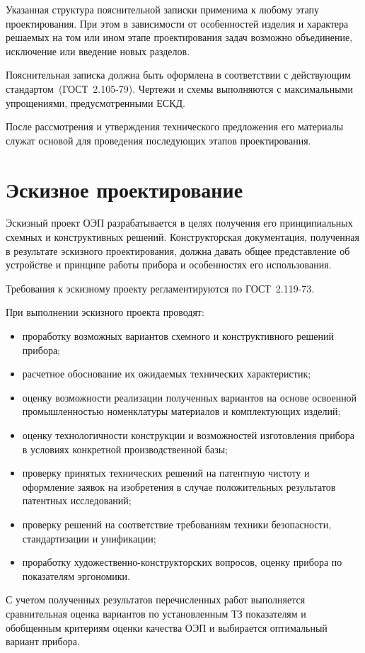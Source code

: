 Указанная структура пояснительной записки применима к любому этапу проектирования. При этом в зависимости от особенностей изделия и характера решаемых на том или ином этапе проектирования задач возможно объединение, исключение или введение новых разделов.

Пояснительная записка должна быть оформлена в соответствии с действующим стандартом~(ГОСТ~2.105-79). Чертежи и схемы выполняются с максимальными упрощениями, предусмотренными ЕСКД.

После рассмотрения и утверждения технического предложения его материалы служат основой для проведения последующих этапов проектирования.

\section{Эскизное проектирование}
Эскизный проект ОЭП разрабатывается в целях получения его принципиальных схемных и конструктивных решений. Конструкторская документация, полученная в результате эскизного проектирования, должна давать общее представление об устройстве и принципе работы прибора и особенностях его использования.

Требования к эскизному проекту регламентируются по ГОСТ~2.119-73.

При выполнении эскизного проекта проводят:
\begin{itemize}
	\item проработку возможных вариантов схемного и конструктивного решений прибора;
	\item расчетное обоснование их ожидаемых технических характеристик;
	\item оценку возможности реализации полученных вариантов на основе освоенной промышленностью номенклатуры материалов и комплектующих изделий;
	\item оценку технологичности конструкции и возможностей изготовления прибора в условиях конкретной производственной базы;
	\item проверку принятых технических решений на патентную чистоту и оформление заявок на изобретения в случае положительных результатов патентных исследований;
	\item проверку решений на соответствие требованиям техники безопасности, стандартизации и унификации;
	\item проработку художественно-конструкторских вопросов, оценку прибора по показателям эргономики.
\end{itemize}

С учетом полученных результатов перечисленных работ выполняется сравнительная оценка вариантов по установленным ТЗ показателям и обобщенным критериям оценки качества ОЭП и выбирается оптимальный вариант прибора.

